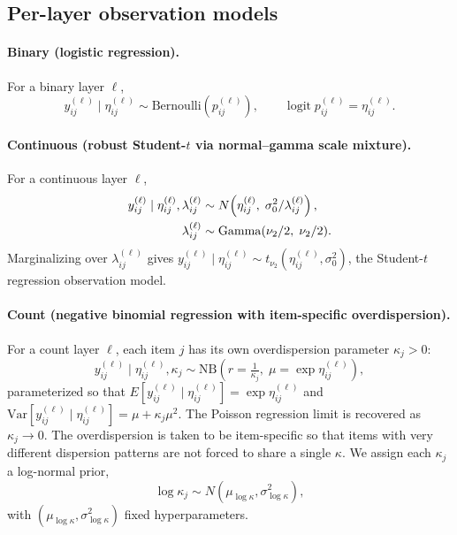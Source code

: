 \documentclass[11pt]{article}
\DeclareMathOperator{\logit}{logit}
\begin{document}
\subsection{Per-layer observation models}

\paragraph{Binary (logistic regression).}
For a binary layer $\ell$,
\begin{equation}
    y_{ij}^{(\ell)}\mid \eta_{ij}^{(\ell)}
    \sim \mathrm{Bernoulli}(p_{ij}^{(\ell)}),
    \qquad
    \logit p_{ij}^{(\ell)}=\eta_{ij}^{(\ell)}.
    \label{eq:lik-binary}
\end{equation}

\paragraph{Continuous (robust Student-$t$ via normal--gamma scale mixture).}
For a continuous layer $\ell$,
\begin{align}
    y_{ij}^{(\ell)}\mid \eta_{ij}^{(\ell)},\lambda_{ij}^{(\ell)}
    &\sim N\!\left(\eta_{ij}^{(\ell)},\;\sigma_0^2/\lambda_{ij}^{(\ell)}\right),
    \notag\\
    \lambda_{ij}^{(\ell)}
    &\sim \mathrm{Gamma}(\nu_2/2,\;\nu_2/2).
    \label{eq:lik-continuous}
\end{align}
Marginalizing over $\lambda_{ij}^{(\ell)}$ gives
$y_{ij}^{(\ell)}\mid \eta_{ij}^{(\ell)}\sim t_{\nu_2}(\eta_{ij}^{(\ell)},\sigma_0^2)$,
the Student-$t$ regression observation model.

\paragraph{Count (negative binomial regression with item-specific overdispersion).}
For a count layer $\ell$, each item $j$ has its own overdispersion
parameter $\kappa_j>0$:
\begin{equation}
    y_{ij}^{(\ell)}\mid \eta_{ij}^{(\ell)},\kappa_j
    \sim \mathrm{NB}\!\left(r=\tfrac{1}{\kappa_j},\;\mu=\exp\eta_{ij}^{(\ell)}\right),
    \label{eq:lik-count}
\end{equation}
parameterized so that
$E[y_{ij}^{(\ell)}\mid\eta_{ij}^{(\ell)}]=\exp\eta_{ij}^{(\ell)}$ and
$\mathrm{Var}[y_{ij}^{(\ell)}\mid\eta_{ij}^{(\ell)}]=\mu+\kappa_j\mu^2$.
The Poisson regression limit is recovered as $\kappa_j\to 0$.  The
overdispersion is taken to be item-specific so that items with very different
dispersion patterns are not forced to share a single $\kappa$.  We assign
each $\kappa_j$ a log-normal prior,
\begin{equation}
    \log\kappa_j\sim N(\mu_{\log\kappa},\sigma_{\log\kappa}^2),
    \label{eq:kappa-prior}
\end{equation}
with $(\mu_{\log\kappa},\sigma_{\log\kappa}^2)$ fixed hyperparameters.
\end{document}
